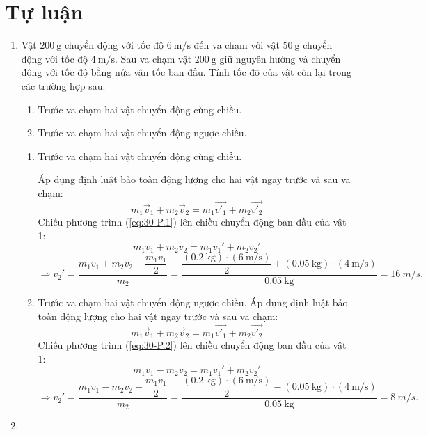 \section{Tự luận}
\begin{enumerate}[label=\bfseries Câu \arabic*:, leftmargin=1.5cm]
	
	
	\item {}
	
	
	{
		Vật $\SI{200}{\gram}$ chuyển động với tốc độ $\SI{6}{\meter/\second}$ đến va chạm với vật $\SI{50}{\gram}$ chuyển động với tốc độ $\SI{4}{\meter/\second}$. Sau va chạm vật $\SI{200}{\gram}$ giữ nguyên hướng và chuyển động với tốc độ bằng nửa vận tốc ban đầu. Tính tốc độ của vật còn lại trong các trường hợp sau:
		\begin{enumerate}[label=\alph*)]
			\item Trước va chạm hai vật chuyển động cùng chiều.
			\item Trước va chạm hai vật chuyển động ngược chiều.
		\end{enumerate}
	}
	
	\hideall
	{	
		\begin{enumerate}[label=\alph*)]
			\item Trước va chạm hai vật chuyển động cùng chiều.
			
			Áp dụng định luật bảo toàn động lượng cho hai vật ngay trước và sau va chạm:
			\begin{equation}
				\label{eq:30-P.1}
				m_1\vec v_1+m_2\vec v_2=m_1\overrightarrow{v'_1}+m_2\overrightarrow{v'_2}
			\end{equation}
		Chiếu phương trình (\ref{eq:30-P.1}) lên chiều chuyển động ban đầu của vật 1:
			$$m_1v_1 + m_2 v_2 = m_1v_1' + m_2 v_2' $$
			$$\Rightarrow v_2'=\dfrac{m_1v_1+m_2v_2-\dfrac{m_1v_1}{2}}{m_2}=\dfrac{\dfrac{\left(\SI{0.2}{\kilogram}\right)\cdot\left(\SI{6}{\meter/\second}\right)}{2}+\left(\SI{0.05}{\kilogram}\right)\cdot\left(\SI{4}{\meter/\second}\right)}{\SI{0.05}{\kilogram}}=\SI{16}{m/s}.$$
			
			\item Trước va chạm hai vật chuyển động ngược chiều.
			Áp dụng định luật bảo toàn động lượng cho hai vật ngay trước và sau va chạm:
			\begin{equation}
				\label{eq:30-P.2}
				m_1\vec v_1+m_2\vec v_2=m_1\overrightarrow{v'_1}+m_2\overrightarrow{v'_2}
			\end{equation}
			Chiếu phương trình (\ref{eq:30-P.2}) lên chiều chuyển động ban đầu của vật 1:
			$$m_1v_1 - m_2 v_2 = m_1v_1' + m_2 v_2' $$
			$$\Rightarrow v_2'=\dfrac{m_1v_1-m_2v_2-\dfrac{m_1v_1}{2}}{m_2}=\dfrac{\dfrac{\left(\SI{0.2}{\kilogram}\right)\cdot\left(\SI{6}{\meter/\second}\right)}{2}-\left(\SI{0.05}{\kilogram}\right)\cdot\left(\SI{4}{\meter/\second}\right)}{\SI{0.05}{\kilogram}}=\SI{8}{m/s}.$$
		\end{enumerate}
	}
	\item {}
	

\end{enumerate}
